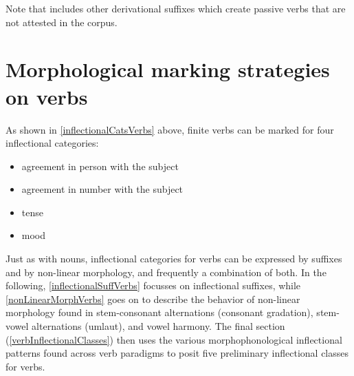 Note that \citet{Ruong1945} includes other derivational suffixes which create passive verbs that are not attested in the corpus. 


\section{Morphological marking strategies on verbs}\label{markingVerbs}
As shown in \SEC\ref{inflectionalCatsVerbs} above, finite verbs can be marked for four inflectional categories: 
\begin{itemize}
\item{agreement in person with the subject}
\item{agreement in number with the subject}
\item{tense}
\item{mood}
\end{itemize}
Just as with nouns, inflectional categories for verbs can be expressed by suffixes and by non-linear morphology, and frequently a combination of both. In the following, \SEC\ref{inflectionalSuffVerbs} focusses on inflectional suffixes, while \SEC\ref{nonLinearMorphVerbs} goes on to describe the behavior of non-linear morphology found in stem-consonant alternations (consonant gradation), stem-vowel alternations (umlaut), %
and vowel harmony. The final section (\ref{verbInflectionalClasses}) then uses the various morphophonological inflectional patterns found across verb paradigms to posit five preliminary inflectional classes for verbs.

\newcommand{\Xp}[1]{\MC{1}{x{80pt}}{#1}}%

